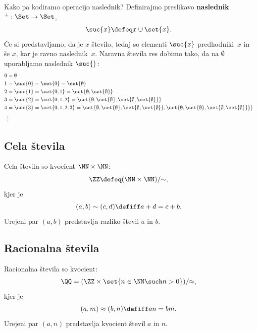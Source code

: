 Kako pa kodiramo operacijo naslednik? Definirajmo preslikavo \textbf{naslednik} ${}^{+} : \Set \to \Set$,
%
\begin{equation*}
  \suc{x} \defeq x \cup \set{x}.
\end{equation*}
%
Če si predstavljamo, da je $x$ število, tedaj so elementi $\suc{x}$ predhodniki~$x$ in še $x$, kar je ravno naslednik~$x$.
Naravna števila res dobimo tako, da na $\emptyset$ uporabljamo naslednik $\suc{{}}$:
%
\begin{align*}
    0 &= \emptyset \\
    1 &= \suc{0} = \set{ 0 } = \set{\emptyset} \\
    2 &= \suc{1} = \set{0, 1} = \set{\emptyset, \set{\emptyset}} \\
    3 &= \suc{2} = \set{0, 1, 2} = \set{\emptyset, \set{\emptyset}, \set{\emptyset, \set{\emptyset}}} \\
    4 &= \suc{3} = \set{0, 1, 2, 3} =
       \set{\emptyset, \set{\emptyset}, \set{\emptyset, \set{\emptyset}},
            \set{\emptyset, \set{\emptyset}, \set{\emptyset, \set{\emptyset}}}} \\
      &\vdots
\end{align*}

\subsection{Cela števila}

Cela števila so kvocient $\NN \times \NN$:
%
\begin{equation*}
    \ZZ \defeq (\NN \times \NN)/{\sim},
\end{equation*}
%
kjer je
%
\begin{equation*}
  (a,b) \sim (c,d) \defiff a + d = c + b.
\end{equation*}
%
Urejeni par $(a, b)$ predstavlja razliko števil $a$ in $b$.


\subsection{Racionalna števila}

Racionalna števila so kvocient:
%
\begin{equation*}
  \QQ = (\ZZ \times \set{n \in \NN \such n > 0})/{\approx},
\end{equation*}
%
kjer je
%
\begin{equation*}
    (a,m) \approx (b,n) \defiff a n = b m.
\end{equation*}
%
Urejeni par $(a, n)$ predstavlja kvocient števil $a$ in $n$.

